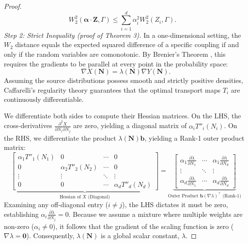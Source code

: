 \documentclass[accepted]{tpm2026} %
\begin{document}
\begin{proof}
\begin{equation}
    W_2^2(\mathbf{\alpha} \cdot \mathbf{Z}, \Gamma) \le \sum_{i=1}^d \alpha_i^2 W_2^2(Z_i, \Gamma). \quad 
\end{equation}
\medskip\noindent\textit{Step 2: Strict Inequality (proof of Theorem 3).}
In a one-dimensional setting, the $W_2$ distance equals the expected squared difference of a specific coupling 
if and only if the random variables are comonotonic. By Brenier's Theorem \citep{brenier1991}, this requires the gradients 
to be parallel at every point in the probability space:
\begin{equation}
    \nabla X(\mathbf{N}) = \lambda(\mathbf{N}) \nabla Y(\mathbf{N}).
\end{equation}
Assuming the source distributions possess smooth and strictly positive densities, Caffarelli's regularity theory \citep{caffarelli1992} 
guarantees that the optimal transport maps $T_i$ are continuously differentiable. 

We differentiate both sides to compute their Hessian matrices. On the LHS, the cross-derivatives $\frac{\partial^2 X}{\partial N_i \partial N_j}$ are zero, 
yielding a diagonal matrix of $\alpha_i T''_i(N_i)$. On the RHS, we differentiate the product $\lambda(\mathbf{N}) \mathbf{b}$, yielding a Rank-1 outer product matrix:
\begin{equation}
    \underbrace{
    \begin{bmatrix} 
    \alpha_1 T''_1(N_1) & 0 & \cdots & 0 \\
    0 & \alpha_2 T''_2(N_2) & \cdots & 0 \\
    \vdots & \vdots & \ddots & \vdots \\
    0 & 0 & \cdots & \alpha_d T''_d(N_d)
    \end{bmatrix}
    }_{\text{Hessian of } X \text{ (Diagonal)}}
    =
    \underbrace{
    \begin{bmatrix}
    \alpha_1 \frac{\partial \lambda}{\partial N_1} & \cdots & \alpha_1 \frac{\partial \lambda}{\partial N_d} \\
    \vdots & \ddots & \vdots \\
    \alpha_d \frac{\partial \lambda}{\partial N_1} & \cdots & \alpha_d \frac{\partial \lambda}{\partial N_d}
    \end{bmatrix}
    }_{\text{Outer Product } \mathbf{b} (\nabla \lambda)^\top \text{ (Rank-1)}}
\end{equation}
Examining any off-diagonal entry ($i \neq j$), the LHS dictates it must be zero, establishing $\alpha_i \frac{\partial \lambda}{\partial N_j} = 0$. 
Because we assume a mixture where multiple weights are non-zero ($\alpha_i \neq 0$), it follows that the gradient of the scaling function is 
zero ($\nabla \lambda = \mathbf{0}$). Consequently, $\lambda(\mathbf{N})$ is a global scalar constant, $\lambda$.


\end{proof}
\end{document}
